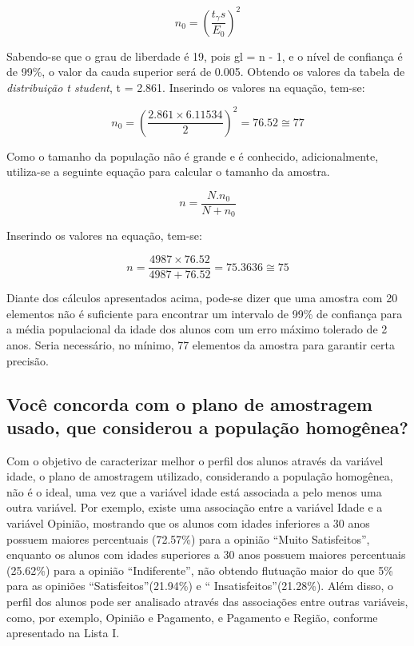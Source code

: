 \begin{equation*}
  n_0 = \left (\frac{t_\gamma s}{E_0} \right)^2
\end{equation*}

Sabendo-se que o grau de liberdade é 19, pois gl = n - 1, e o nível de confiança é de 99\%, o valor da cauda superior será de 0.005. Obtendo os valores da tabela de \textit{distribuição t student}, t 
= 2.861. Inserindo os valores na equação, tem-se:

\begin{equation*}
 n_0 = \left (\frac{2.861 \times 6.11534}{2} \right)^2 = 76.52 \cong 77
\end{equation*}

Como o tamanho da população não é grande e é conhecido, adicionalmente, utiliza-se a seguinte equação para calcular o tamanho da amostra.

\begin{equation*}
 n = \frac{N . n_0}{N + n_0}
\end{equation*}

Inserindo os valores na equação, tem-se:

\begin{equation*}
 n = \frac{4987 \times 76.52}{4987 + 76.52} = 75.3636 \cong 75 %
\end{equation*}

Diante dos cálculos apresentados acima, pode-se dizer que uma amostra com 20 elementos não é suficiente para encontrar um intervalo de 99\% de confiança para a média populacional da idade dos alunos 
com um erro máximo tolerado de 2 anos. Seria necessário, no mínimo, 77 elementos da amostra para garantir certa precisão. 

\subsection{Você concorda com o plano de amostragem usado, que considerou a população homogênea?}
Com o objetivo de caracterizar melhor o perfil dos alunos através da variável idade, o plano de amostragem utilizado, considerando a população homogênea, não é o ideal, uma vez que a variável idade 
está associada a pelo menos uma outra variável. Por exemplo, existe uma associação entre a variável Idade e a variável Opinião, mostrando que os alunos com idades inferiores a 30 anos possuem maiores 
percentuais (72.57\%) para a opinião \textquotedblleft Muito Satisfeitos\textquotedblright, enquanto os alunos com idades superiores a 30 anos possuem maiores percentuais (25.62\%) para a opinião 
\textquotedblleft Indiferente\textquotedblright, não obtendo flutuação maior do que 5\% para as opiniões \textquotedblleft Satisfeitos\textquotedblright (21.94\%) e \textquotedblleft 
Insatisfeitos\textquotedblright (21.28\%). Além disso, o perfil dos alunos pode ser analisado através das associações entre outras variáveis, como, por exemplo, Opinião e Pagamento, e Pagamento e 
Região, conforme apresentado na Lista I. 

